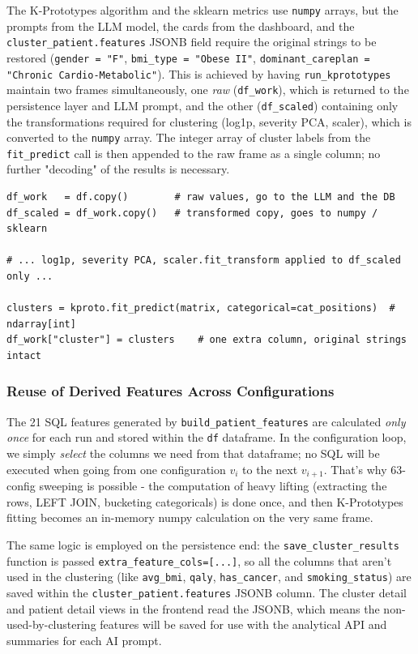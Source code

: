 The K-Prototypes algorithm and the sklearn metrics use \texttt{numpy} arrays, but the prompts from the LLM model, the cards from the dashboard, and the \texttt{cluster\_\allowbreak patient.features} JSONB field require the original strings to be restored (\texttt{gender = "F"}, \texttt{bmi\_\allowbreak type = "Obese II"}, \texttt{dominant\_\allowbreak careplan = "Chronic Cardio-Metabolic"}). This is achieved by having \texttt{run\_\allowbreak kprototypes} maintain two frames simultaneously, one \emph{raw} (\texttt{df\_\allowbreak work}), which is returned to the persistence layer and LLM prompt, and the other (\texttt{df\_\allowbreak scaled}) containing only the transformations required for clustering (log1p, severity PCA, scaler), which is converted to the \texttt{numpy} array. The integer array of cluster labels from the \texttt{fit\_\allowbreak predict} call is then appended to the raw frame as a single column; no further "decoding" of the results is necessary.

\begin{lstlisting}[style=pythonstyle]
df_work   = df.copy()        # raw values, go to the LLM and the DB
df_scaled = df_work.copy()   # transformed copy, goes to numpy / sklearn

# ... log1p, severity PCA, scaler.fit_transform applied to df_scaled only ...

clusters = kproto.fit_predict(matrix, categorical=cat_positions)  # ndarray[int]
df_work["cluster"] = clusters    # one extra column, original strings intact
\end{lstlisting}


\subsubsection*{Reuse of Derived Features Across Configurations}

The 21 SQL features generated by \texttt{build\_patient\_features} are calculated \emph{only once} for each run and stored within the \texttt{df} dataframe. In the configuration loop, we simply \emph{select} the columns we need from that dataframe; no SQL will be executed when going from one configuration \(v_i\) to the next \(v_{i+1}\). That's why 63-config sweeping is possible - the computation of heavy lifting (extracting the rows, LEFT JOIN, bucketing categoricals) is done once, and then K-Prototypes fitting becomes an in-memory numpy calculation on the very same frame.

The same logic is employed on the persistence end: the \texttt{save\_cluster\_results} function is passed \texttt{extra\_feature\_cols=[...]}, so all the columns that aren't used in the clustering (like \texttt{avg\_bmi}, \texttt{qaly}, \texttt{has\_cancer}, and \texttt{smoking\_status}) are saved within the \texttt{cluster\_patient.features} JSONB column. The cluster detail and patient detail views in the frontend read the JSONB, which means the non-used-by-clustering features will be saved for use with the analytical API and summaries for each AI prompt.


